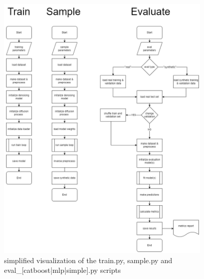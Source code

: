 \begin{figure}[H]
	\centering
	\includegraphics[width=0.9\textwidth]{images/train-sample-eval.png}
	\caption[Train, Sample, Evaluation Script]{simplified visualization of the train.py, sample.py and eval\_[catboost|mlp|simple].py scripts}
	\label{fig:a_original_train_sample_eval}
\end{figure}


